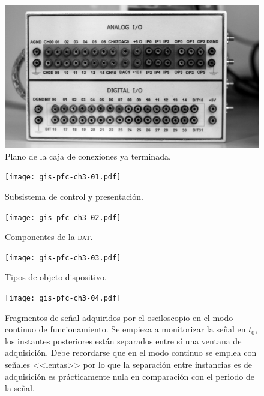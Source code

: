 \documentclass[a4paper,12pt]				{article}
\begin{document}
\begin{figure}
	\begin{center}
		\includegraphics[scale=1, keepaspectratio=true]
		{gis-pfc-ch2-05.jpg}
	\end{center}
	\caption[Plano de la caja de conexiones ya terminada]{Plano de la
	caja de conexiones ya terminada.}
	\label{fig:conbox}
\end{figure}

\clearpage

\begin{figure}
	\begin{center}
		\texttt{[image: gis-pfc-ch3-01.pdf]}
	\end{center}
	\caption[Subsistema de control y presentación]{Subsistema de
	control y presentación.}
	\label{sub:control}
\end{figure}

\begin{figure}
	\begin{center}
		\texttt{[image: gis-pfc-ch3-02.pdf]}
	\end{center}
	\caption[Componentes de la \textsc{dat}]{Componentes de la
	\textsc{dat}.}
	\label{fig:dat}
\end{figure}

\begin{figure}
	\begin{center}
		\texttt{[image: gis-pfc-ch3-03.pdf]}
	\end{center}
	\caption[Tipos de objeto dispositivo]{Tipos de objeto dispositivo.}
	\label{fig:devobject}
\end{figure}

\begin{figure}
	\begin{center}
		\texttt{[image: gis-pfc-ch3-04.pdf]}
	\end{center}
	\caption[Fragmentos de señal ordenados según llegan al
	osciloscopio]{Fragmentos de señal adquiridos por el osciloscopio en
	el modo continuo de funcionamiento. Se empieza a monitorizar la
	señal en $t_0$, los instantes posteriores están separados entre sí
	una ventana de adquisición. Debe recordarse que en el modo continuo
	se emplea con señales <<lentas>> por lo que la separación entre
	instancias es de adquisición es prácticamente nula en comparación
	con el periodo de la señal.}
	\label{fig:freesignalcont}
\end{figure}
\end{document}
